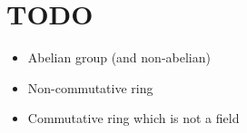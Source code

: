 \section{TODO}\par
\begin{itemize}
  \item Abelian group (and non-abelian)
  \item Non-commutative ring
  \item Commutative ring which is not a field
\end{itemize}
